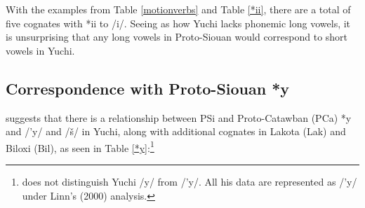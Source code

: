 \documentclass[output=paper]{LSP/langsci}
\begin{document}
{With the examples from Table \ref{motionverbs} and Table \ref{*ii}, there are a total of five cognates with *ii to /i/. Seeing as how Yuchi lacks phonemic long vowels, it is unsurprising that any long vowels in Proto-Siouan would correspond to short vowels in Yuchi.  

\subsection{Correspondence with Proto-Siouan *y}

\citet{Carter1980} suggests that there is a relationship between PSi and Proto-Catawban (PCa) *y and /'y/ and /\v{s}/ in Yuchi, along with additional cognates in Lakota (Lak) and Biloxi (Bil), as seen in Table \ref{*y}:\footnote{\citet{Carter1980} does not distinguish Yuchi /y/ from /'y/. All his data are represented as /'y/ under Linn's (2000) analysis.}

\begin{table}
\caption{Correspondences between PSi *y and Yuchi /'y/ and /\v{s}/}\label{*y}
\end{table}

}
\end{document}
